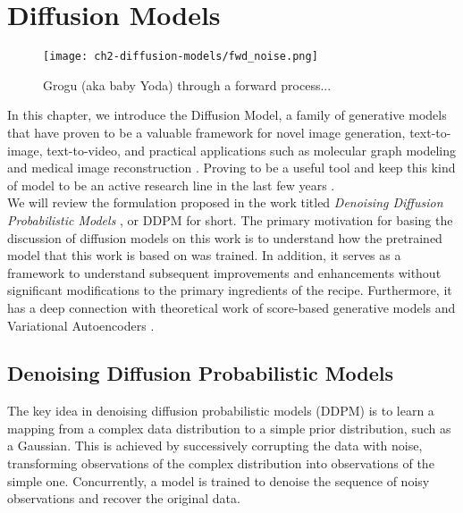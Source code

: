 \chapter{Diffusion Models}


\begin{figure}[ht]
    \centering
    \texttt{[image: ch2-diffusion-models/fwd\_noise.png]}
    \captionsetup{width=\textwidth} %
    \caption{Grogu (aka baby Yoda) through a forward process...}
    \label{fig:fwd-process-grogu}
\end{figure}
  
In this chapter, we introduce the Diffusion Model, a family of generative models that have proven to be a valuable framework for novel image generation, text-to-image, text-to-video, and practical applications such as molecular graph modeling and medical image reconstruction \citep{sohldickstein2015deep, ramesh2021zeroshot,rombach2022highresolution,ho2020denoising,singer2022makeavideo,jing2023torsional,song2020denoising}. Proving to be a useful tool and keep this kind of model to be an active research line in the last few years \citep{yang2024diffusion}. \\

We will review the formulation proposed in the work titled \textit{Denoising Diffusion Probabilistic Models} \cite{ho2020denoising}, or DDPM for short. 
The primary motivation for basing the discussion of diffusion models on this work is to understand how the pretrained model that this work is based on was trained. In addition, it serves as a framework to understand subsequent improvements and enhancements without significant modifications to the primary ingredients of the recipe. Furthermore, it has a deep connection with theoretical work of score-based generative models \citep{song2020denoising} and Variational Autoencoders \citep{luo2022understanding}.

\section{Denoising Diffusion Probabilistic Models}

The key idea in denoising diffusion probabilistic models (DDPM) is to learn a mapping from a complex data distribution to a simple prior distribution, such as a Gaussian. This is achieved by successively corrupting the data with noise, transforming observations of the complex distribution into observations of the simple one. Concurrently, a model is trained to denoise the sequence of noisy observations and recover the original data.\\

